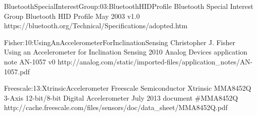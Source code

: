 %
%
%
%
%
%

\newcommand{\urlEqual}{=}


\newdocref
    {BluetoothSpecialInterestGroup:03:BluetoothHIDProfile}
    {{Bluetooth Special Interest Group}}
    {Bluetooth HID Profile}
    {May}
    {2003}
    {v1.0}
    {https://bluetooth.org/Technical/Specifications/adopted.htm}

\newdocref
    {Fisher:10:UsingAnAccelerometerForInclinationSensing}
    {Christopher J. Fisher}
    {Using an Accelerometer for Inclination Sensing}
    {}
    {2010}
    {Analog Devices application note AN-1057 v0}
    {http://analog.com/static/imported-files/application_notes/AN-1057.pdf}

\newdocref
    {Freescale:13:XtrinsicAccelerometer}
    {{Freescale Semiconductor}}
    {Xtrinsic MMA8452Q 3-Axis 12-bit/8-bit Digital Accelerometer}
    {July}
    {2013}
    {document \#MMA8452Q}
    {http://cache.freescale.com/files/sensors/doc/data_sheet/MMA8452Q.pdf}

